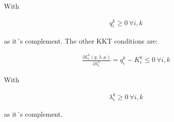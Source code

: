 \documentclass[a4paper,12pt]{article}
\theoremstyle{remark}
\begin{document}
With

\begin{gather}
q_i^k \geq 0 \ \forall i,k
\end{gather}

as it´s complement.
The other KKT conditions are:

\begin{gather}
\frac{\partial L_i^k(q,\lambda,\mu)}{\partial \lambda_i^k}	= q_i^k-K_i^k \leq 0 \ \forall i,k
\end{gather}

With 

\begin{gather}
\lambda_i^k \geq 0 \  \forall i,k
\end{gather}

as it´s complement.
\end{document}
